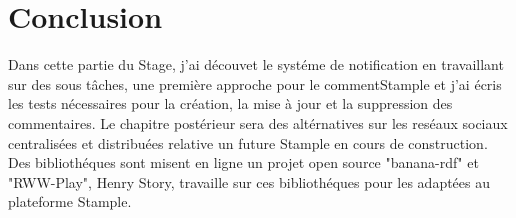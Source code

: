 \section{Conclusion}
Dans cette partie du Stage, j'ai découvet le systéme de notification en travaillant sur des sous tâches, une première approche pour le commentStample et j'ai écris les tests nécessaires pour la création, la mise à jour et la suppression des commentaires.
Le chapitre postérieur sera des altérnatives sur les reséaux sociaux centralisées et distribuées relative un future Stample en cours de construction.
Des bibliothéques sont misent en ligne un projet open source "banana-rdf" et "RWW-Play", Henry Story, travaille sur ces bibliothéques pour les adaptées au plateforme Stample.
